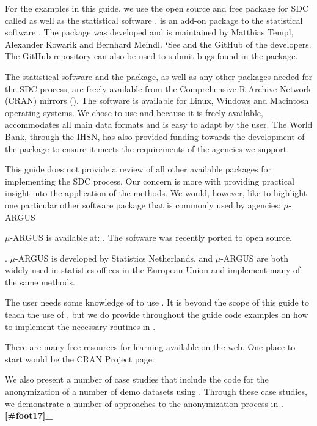 \documentclass[letterpaper,10pt,english]{sphinxmanual}
\begin{document}
For the examples in this guide, we use the open source and free package
for SDC called  as well as the statistical software .
 is an add-on package to the statistical software . The
package was developed and is maintained by Matthias Templ, Alexander
Kowarik and Bernhard Meindl. {\color{red}\bfseries{}{}`}See and the GitHub of the developers. The
GitHub repository can also be used to submit bugs found in the
package. %
\begin{footnote}[2]\sphinxAtStartFootnote
{}
%
\end{footnote} The statistical software  and the 
package, as well as any other packages needed for the SDC process, are
freely available from the Comprehensive R Archive Network (CRAN) mirrors
(). The software is available for Linux,
Windows and Macintosh operating systems. We chose to use  and
 because it is freely available, accommodates all main data
formats and is easy to adapt by the user. The World Bank, through the
IHSN, has also provided funding towards the development of the
 package to ensure it meets the requirements of the agencies
we support.

This guide does not provide a review of all other available packages for
implementing the SDC process. Our concern is more with providing
practical insight into the application of the methods. We would,
however, like to highlight one particular other software package that is
commonly used by agencies: \(\mu\)-ARGUS %
\begin{footnote}[3]\sphinxAtStartFootnote
\(\mu\)-ARGUS is available at: . The
software was recently ported to open source.
%
\end{footnote}. \(\mu\)-ARGUS is
developed by Statistics Netherlands.  and \(\mu\)-ARGUS are both
widely used in statistics offices in the European Union and implement
many of the same methods.

The user needs some knowledge of  to use . It is beyond the
scope of this guide to teach the use of , but we do provide
throughout the guide code examples on how to implement the necessary
routines in . %
\begin{footnote}[4]\sphinxAtStartFootnote
There are many free resources for learning  available on the web.
One place to start would be the CRAN  Project page:
%
\end{footnote} We also present a number of case
studies that include the code for the anonymization of a number of demo
datasets using . Through these case studies, we demonstrate a number
of approaches to the anonymization process in . {\color{red}\bfseries{}{[}\#foot17{]}\_}
\end{document}
